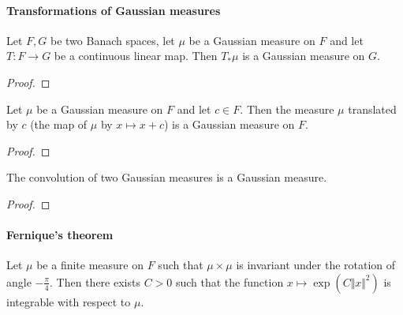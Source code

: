 \paragraph{Transformations of Gaussian measures}

\begin{lemma}\label{lem:isGaussian_map}
  \mathlibok
Let $F, G$ be two Banach spaces, let $\mu$ be a Gaussian measure on $F$ and let $T : F \to G$ be a continuous linear map.
Then $T_*\mu$ is a Gaussian measure on $G$.
\end{lemma}

\begin{proof}\leanok

\end{proof}


\begin{lemma}\label{lem:isGaussian_add_const}
  \leanok
Let $\mu$ be a Gaussian measure on $F$ and let $c \in F$.
Then the measure $\mu$ translated by $c$ (the map of $\mu$ by $x \mapsto x + c$) is a Gaussian measure on $F$.
\end{lemma}

\begin{proof}\leanok

\end{proof}


\begin{lemma}\label{lem:isGaussian_conv}
  \mathlibok
The convolution of two Gaussian measures is a Gaussian measure.
\end{lemma}

\begin{proof}\leanok

\end{proof}



\paragraph{Fernique's theorem}


\begin{theorem}\label{thm:exists_integrable_exp_sq_of_map_rotation_eq_self}
  \leanok
Let $\mu$ be a finite measure on $F$ such that $\mu \times \mu$ is invariant under the rotation of angle $-\frac{\pi}{4}$.
Then there exists $C > 0$ such that the function $x \mapsto \exp (C \Vert x \Vert ^ 2)$ is integrable with respect to $\mu$.
\end{theorem}

